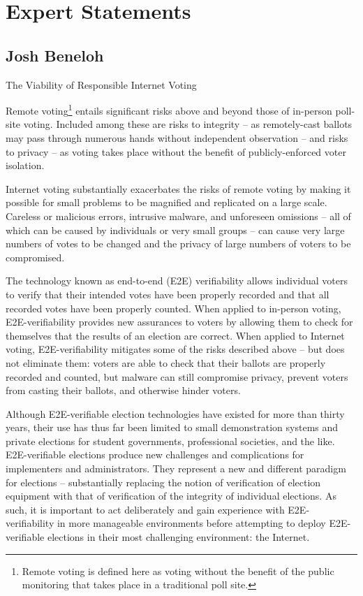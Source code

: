 \chapter{Expert Statements}
\label{appendix:expert_statements}

\section{Josh Beneloh}

The Viability of Responsible Internet Voting

Remote voting\footnote{Remote voting is defined here as voting without
  the benefit of the public monitoring that takes place in a
  traditional poll site.}  entails significant risks above and beyond
those of in-person poll-site voting.  Included among these are risks
to integrity – as remotely-cast ballots may pass through numerous
hands without independent observation – and risks to privacy – as
voting takes place without the benefit of publicly-enforced voter
isolation.

Internet voting substantially exacerbates the risks of remote voting
by making it possible for small problems to be magnified and
replicated on a large scale.  Careless or malicious errors, intrusive
malware, and unforeseen omissions – all of which can be caused by
individuals or very small groups – can cause very large numbers of
votes to be changed and the privacy of large numbers of voters to be
compromised.

The technology known as end-to-end (E2E) verifiability allows
individual voters to verify that their intended votes have been
properly recorded and that all recorded votes have been properly
counted.  When applied to in-person voting, E2E-verifiability provides
new assurances to voters by allowing them to check for themselves that
the results of an election are correct.  When applied to Internet
voting, E2E-verifiability mitigates some of the risks described above
– but does not eliminate them:  voters are able to check that their
ballots are properly recorded and counted, but malware can still
compromise privacy, prevent voters from casting their ballots, and
otherwise hinder voters.

Although E2E-verifiable election technologies have existed for more
than thirty years, their use has thus far been limited to small
demonstration systems and private elections for student governments,
professional societies, and the like.  E2E-verifiable elections
produce new challenges and complications for implementers and
administrators.  They represent a new and different paradigm for
elections – substantially replacing the notion of verification of
election equipment with that of verification of the integrity of
individual elections.  As such, it is important to act deliberately
and gain experience with E2E-verifiability in more manageable
environments before attempting to deploy E2E-verifiable elections in
their most challenging environment:  the Internet.

